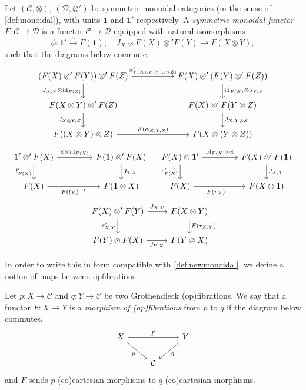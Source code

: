 \documentclass{MetricNotes2023}
\def\id{\ensuremath\text{id}}
\begin{document}
\begin{definition}
Let \((\mathcal{C}, \otimes)\), \((\mathcal{D}, \otimes')\) be symmetric monoidal categories (in the sense of \ref{def:monoidal}), with units \(\textbf{1}\) and \(\textbf{1}'\) respectively. A \textit{symmetric monoidal functor} \(F : \mathcal{C} \to \mathcal{D}\) is a functor \(\mathcal{C} \to \mathcal{D}\) equipped with natural isomorphisms
\[\phi : \textbf{1}'\xrightarrow\sim F(\textbf{1}), \quad J_{X,Y} : F(X)\otimes' F(Y) \to F(X\otimes Y),\]
such that the diagrams below commute.
\[\begin{tikzcd}[column sep=12ex]
(F(X)\otimes' F(Y))\otimes' F(Z) \arrow[r, "\alpha'_{F(X), F(Y), F(Z)}"] \arrow[d, swap, "J_{X,Y}\otimes\id_{F(Z)}"]  & F(X)\otimes' (F(Y)\otimes' F(Z)) \arrow[d, "\id_{F(X)}\otimes J_{Y,Z}"]  \\
F(X\otimes Y)\otimes' F(Z) \arrow[d, swap, "J_{X\otimes Y, Z}"]  & F(X)\otimes'F(Y\otimes Z) \arrow[d, "J_{X, Y\otimes Z}"]\\
F((X\otimes Y)\otimes Z) \arrow[r, "F(\alpha_{X,Y,Z})"] & F(X\otimes (Y\otimes Z))
\end{tikzcd}\]
\[\begin{tikzcd}[column sep=10ex]
\textbf{1}'\otimes' F(X) \arrow[r, "\phi\otimes\id_{F(X)}"] \arrow[d, swap, "l'_{F(X)}"]  & F(\textbf{1})\otimes' F(X) \arrow[d, "J_{\textbf{1}, X}"]  \\
F(X) \arrow[r, swap, "F(l_X)^{-1}"]  & F(\textbf{1}\otimes X)
\end{tikzcd}\quad \begin{tikzcd}[column sep=10ex]
F(X) \otimes \textbf{1}' \arrow[r, "\id_{F(X)}\otimes\phi"] \arrow[d, swap, "r'_{F(X)}"]  & F(X)\otimes' F(\textbf{1}) \arrow[d, "J_{X, \textbf{1}}"]  \\
F(X) \arrow[r, swap, "F(r_X)^{-1}"]  & F(X\otimes \textbf{1})
\end{tikzcd}\]
\[\begin{tikzcd}
F(X)\otimes'F(Y) \arrow[r, "J_{X, Y}"] \arrow[d, swap, "\tau'_{X, Y}"]  & F(X\otimes Y) \arrow[d, "F(\tau_{X,Y})"]  \\
F(Y)\otimes F(X) \arrow[r, swap, "J_{Y, X}"]  & F(Y\otimes X)
\end{tikzcd}\]
\end{definition}

In order to write this in form compatible with \ref{def:newmonoidal}, we define a notion of maps between opfibrations.

\begin{definition}
Let \(p : X \to \mathcal{C}\) and \(q : Y \to \mathcal{C}\) be two Grothendieck (op)fibrations. We say that a functor \(F : X \to Y\) is a \textit{morphism of (op)fibrations} from \(p\) to \(q\) if the diagram below commutes,
\[\begin{tikzcd}
X \arrow[rd, swap, "p"] \arrow[rr, "F"]  & & Y \arrow[ld, "q"]  \\
& \mathcal{C}  & 
\end{tikzcd}\]
and \(F\) sends \(p\)-(co)cartesian morphisms to \(q\)-(co)cartesian morphisms. 
\end{definition}
\end{document}
